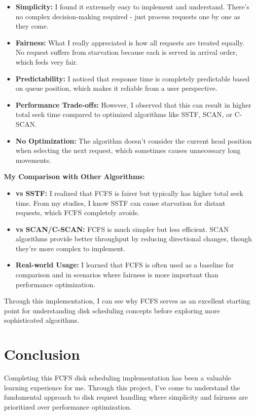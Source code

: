\documentclass[12pt,a4paper]{article}
\begin{document}
\begin{itemize}
    \item \textbf{Simplicity:} I found it extremely easy to implement and understand. There's no complex decision-making required - just process requests one by one as they come.
    \item \textbf{Fairness:} What I really appreciated is how all requests are treated equally. No request suffers from starvation because each is served in arrival order, which feels very fair.
    \item \textbf{Predictability:} I noticed that response time is completely predictable based on queue position, which makes it reliable from a user perspective.
    \item \textbf{Performance Trade-offs:} However, I observed that this can result in higher total seek time compared to optimized algorithms like SSTF, SCAN, or C-SCAN.
    \item \textbf{No Optimization:} The algorithm doesn't consider the current head position when selecting the next request, which sometimes causes unnecessary long movements.
\end{itemize}

\textbf{My Comparison with Other Algorithms:}
\begin{itemize}
    \item \textbf{vs SSTF:} I realized that FCFS is fairer but typically has higher total seek time. From my studies, I know SSTF can cause starvation for distant requests, which FCFS completely avoids.
    \item \textbf{vs SCAN/C-SCAN:} FCFS is much simpler but less efficient. SCAN algorithms provide better throughput by reducing directional changes, though they're more complex to implement.
    \item \textbf{Real-world Usage:} I learned that FCFS is often used as a baseline for comparison and in scenarios where fairness is more important than performance optimization.
\end{itemize}

Through this implementation, I can see why FCFS serves as an excellent starting point for understanding disk scheduling concepts before exploring more sophisticated algorithms.

\section{Conclusion}
Completing this FCFS disk scheduling implementation has been a valuable learning experience for me. Through this project, I've come to understand the fundamental approach to disk request handling where simplicity and fairness are prioritized over performance optimization.
\end{document}
